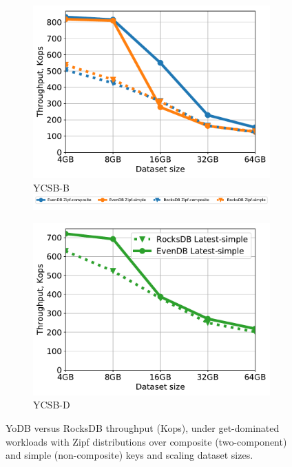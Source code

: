 \documentclass[letterpaper,twocolumn,10pt]{article}
\newcommand{\sys}{YoDB}
\begin{document}
\begin{figure}[tb]
\centering
\begin{subfigure}{0.45\linewidth}
\includegraphics[width=\textwidth]{figs/Workload_B_line.pdf}
\caption{YCSB-B \\ \includegraphics[width=\textwidth]{figs/legend.pdf}}
\label{fig:throughput:b}
\end{subfigure}
\begin{subfigure}{0.45\linewidth}
\includegraphics[width=\textwidth]{figs/Workload_D_line.pdf}
\caption{YCSB-D \\\vspace{7mm}}
\label{fig:throughput:d}
\end{subfigure}
\begin{subfigure}{0.45\linewidth}
\end{subfigure}

\caption{
{\sys\/ versus RocksDB throughput (Kops), under get-dominated workloads with Zipf distributions over composite (two-component) and
simple (non-composite) keys and scaling dataset sizes.}
}
\label{fig:gets}
\end{figure}
\end{document}
